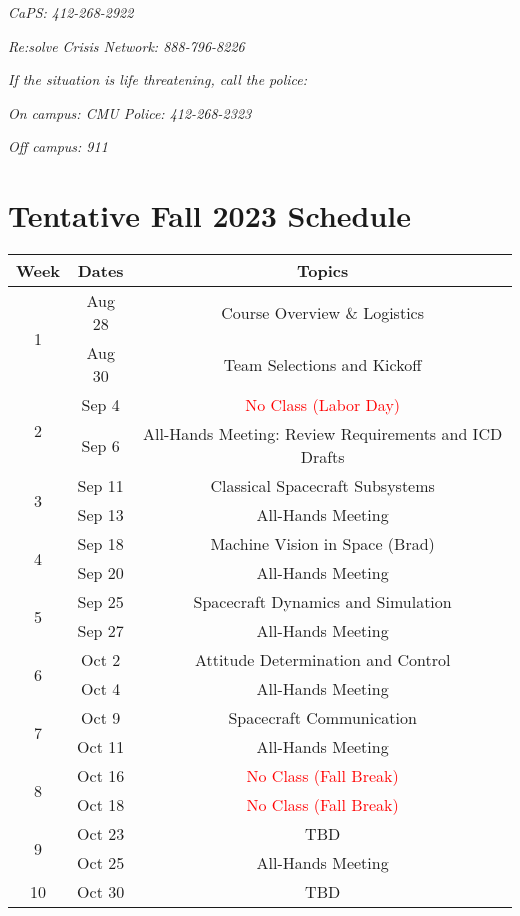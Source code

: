 \documentclass[11pt,letterpaper]{article}
\begin{document}
\textit{CaPS: 412-268-2922}

\textit{Re:solve Crisis Network: 888-796-8226}

\medskip
\noindent
\textit{If the situation is life threatening, call the police:}

\textit{On campus: CMU Police: 412-268-2323}

\textit{Off campus: 911}


\section*{Tentative Fall 2023 Schedule}

\begin{tabular}{c|c|c}
	Week & Dates & Topics \\
	\hline
	\multirow{2}{*}{1} & Aug 28 & Course Overview \& Logistics \\
	 & Aug 30 & Team Selections and Kickoff \\
	\hline
	\multirow{2}{*}{2} & Sep 4 & \textcolor{red}{No Class (Labor Day)} \\
	 & Sep 6 & All-Hands Meeting: Review Requirements and ICD Drafts \\
	\hline
	\multirow{2}{*}{3}  & Sep 11 & Classical Spacecraft Subsystems \\
	 & Sep 13 & All-Hands Meeting \\
	\hline
	\multirow{2}{*}{4}  & Sep 18 & Machine Vision in Space (Brad) \\
	 & Sep 20 & All-Hands Meeting \\
	\hline
	\multirow{2}{*}{5}  & Sep 25 & Spacecraft Dynamics and Simulation  \\
	 & Sep 27 & All-Hands Meeting \\
	\hline
	\multirow{2}{*}{6}  & Oct 2 & Attitude Determination and Control \\
	 & Oct 4 & All-Hands Meeting \\
	\hline
	\multirow{2}{*}{7}  & Oct 9 & Spacecraft Communication \\
	 & Oct 11 & All-Hands Meeting \\
	\hline
	\multirow{2}{*}{8}  & Oct 16 & \textcolor{red}{No Class (Fall Break)} \\
	 & Oct 18 & \textcolor{red}{No Class (Fall Break)} \\
	\hline
	\multirow{2}{*}{9}  & Oct 23 & TBD \\
	 & Oct 25 & All-Hands Meeting \\
	\hline
	\multirow{2}{*}{10}  & Oct 30 & TBD \\

\end{tabular}
\end{document}
